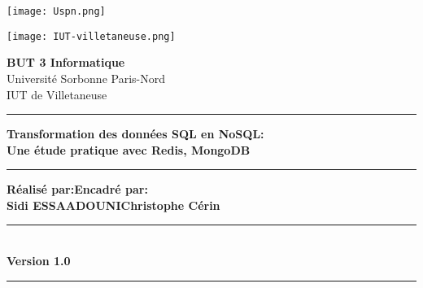 \begin{titlepage}
  \parbox{0.2\linewidth}{\texttt{[image: Uspn.png]}}
  \hspace{9cm}
  \parbox{0.2\linewidth}{\texttt{[image: IUT-villetaneuse.png]}}
  
  \vspace{2cm}
  \begin{center}
    \textbf{BUT 3 Informatique}\\
    \vspace{1cm}
    \large{Université Sorbonne Paris-Nord}\\
    \vspace{0.2cm}
    \large{IUT de Villetaneuse}
  \end{center}
  
  \vspace{1.5cm}
  
  \begin{center}
    \rule{0.9\textwidth}{3pt}
    \huge{\textbf{Transformation des données SQL en NoSQL:}}\\
    \huge{\textbf{Une étude pratique avec Redis, MongoDB}}\\
    \rule{0.9\textwidth}{3pt}
  \end{center}
  
  \vspace{3cm}
  
  \begin{large}
    \begin{flushleft}
      \hspace{1cm}\textbf{Réalisé par:}\hspace{9.5cm}\textbf{Encadré par:}\\
      \vspace{0.25cm}
      \hspace{1cm}\textbf{Sidi ESSAADOUNI}\hspace{8cm}\textbf{Christophe Cérin}
    \end{flushleft}
  \end{large}
  
  \vspace{1cm}
  
  \begin{center}
    \rule{0.6\textwidth}{3pt}\\
    \huge{\textbf{Version 1.0}}\\
    \rule{0.6\textwidth}{3pt}
  \end{center}
\end{titlepage}
